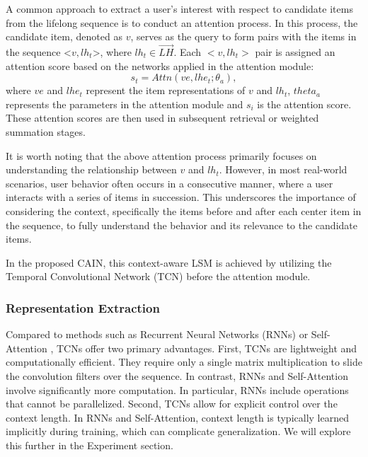 A common approach to extract a user's interest with respect to candidate items from the lifelong sequence is to conduct an attention process. In this process, the candidate item, denoted as $v$, serves as the query to form pairs with the items in the sequence <$v, lh_t$>, where $lh_t \in \vec{LH}$. Each $<v, lh_t>$ pair is assigned an attention score based on the networks applied in the attention module:
\begin{equation} 
    s_t = Attn(ve, lhe_t;\theta_a),
\label{eq:attention}
\end{equation}
where $ve$ and $lhe_t$ represent the item representations of $v$ and $lh_t$, $theta_a$ represents the parameters in the attention module and $s_{i}$ is the attention score. These attention scores are then used in subsequent retrieval or weighted summation stages. 

It is worth noting that the above attention process primarily focuses on understanding the relationship between $v$ and $lh_t$. However, in most real-world scenarios, user behavior often occurs in a consecutive manner, where a user interacts with a series of items in succession. This underscores the importance of considering the context, specifically the items before and after each center item in the sequence, to fully understand the behavior and its relevance to the candidate items.

In the proposed CAIN, this context-aware LSM is achieved by utilizing the Temporal Convolutional Network (TCN) \cite{bai2018empirical} before the attention module. 

\subsubsection{Representation Extraction}

Compared to methods such as Recurrent Neural Networks (RNNs) \cite{hochreiter1997long, chung2014empirical} or Self-Attention \cite{vaswani2017attention}, TCNs offer two primary advantages. First, TCNs are lightweight and computationally efficient. They require only a single matrix multiplication to slide the convolution filters over the sequence. In contrast, RNNs and Self-Attention involve significantly more computation. In particular, RNNs include operations that cannot be parallelized. Second, TCNs allow for explicit control over the context length. In RNNs and Self-Attention, context length is typically learned implicitly during training, which can complicate generalization. We will explore this further in the Experiment section.

